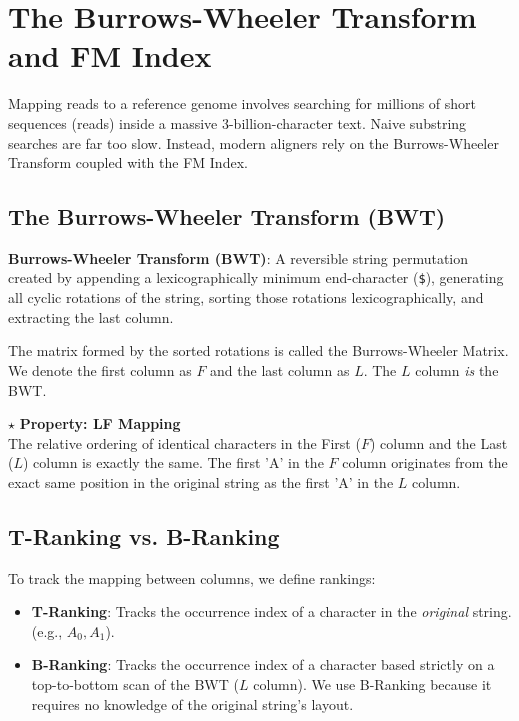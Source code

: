 \documentclass[11pt, a4paper]{article}
\newenvironment{important}{%
    \begin{tcolorbox}[colback=blue!5!white,colframe=blue!75!black,title=Important Concept]
}{%
    \end{tcolorbox}
}
\newcommand{\sta}{\textbf{\color{red}$\star$ }}
\begin{document}
\section{The Burrows-Wheeler Transform and FM Index}
Mapping reads to a reference genome involves searching for millions of short sequences (reads) inside a massive 3-billion-character text. Naive substring searches are far too slow. Instead, modern aligners rely on the Burrows-Wheeler Transform coupled with the FM Index.

\subsection{The Burrows-Wheeler Transform (BWT)}
\begin{important}
    \textbf{Burrows-Wheeler Transform (BWT)}: A reversible string permutation created by appending a lexicographically minimum end-character (\texttt{\$}), generating all cyclic rotations of the string, sorting those rotations lexicographically, and extracting the last column.
\end{important}

The matrix formed by the sorted rotations is called the Burrows-Wheeler Matrix. We denote the first column as $F$ and the last column as $L$. The $L$ column \textit{is} the BWT.


\sta \textbf{Property: LF Mapping} \\
The relative ordering of identical characters in the First ($F$) column and the Last ($L$) column is exactly the same. The first 'A' in the $F$ column originates from the exact same position in the original string as the first 'A' in the $L$ column.

\subsection{T-Ranking vs. B-Ranking}
To track the mapping between columns, we define rankings:
\begin{itemize}
    \item \textbf{T-Ranking}: Tracks the occurrence index of a character in the \textit{original} string. (e.g., $A_0, A_1$).
    \item \textbf{B-Ranking}: Tracks the occurrence index of a character based strictly on a top-to-bottom scan of the BWT ($L$ column). We use B-Ranking because it requires no knowledge of the original string's layout.
\end{itemize}
\end{document}
